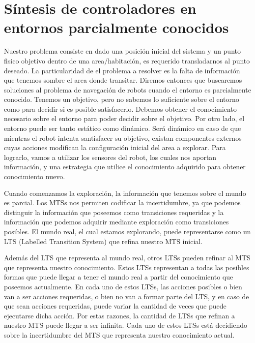 \chapter{Síntesis de controladores en entornos parcialmente conocidos}

Nuestro problema consiste en dado una posición inicial del sistema y un punto 
fisico objetivo dentro de una area/habitación, es requerido transladarnos al 
punto deseado. La particularidad de el problema a resolver es la falta de 
información que tenemos sombre el area donde transitar. Diremos entonces que 
buscaremos soluciones al problema de navegación de robots cuando el entorno es 
parcialmente conocido.
Tenemos un objetivo, pero no sabemos lo suficiente sobre el entorno como para 
decidir si es 
posible satisfacerlo. Debemos obtener el conocimiento necesario sobre el 
entorno para poder decidir sobre el objetivo. 
Por otro lado, el entorno puede ser tanto estático como dinámico. Será dinámico 
en caso de que mientras el robot intenta santisfacer su objetivo, existan 
componentes externos cuyas acciones modifican la configuración inicial del area 
a explorar.
Para lograrlo, vamos a utilizar los sensores del robot, los cuales nos aportan 
información, y una estrategia que 
utilice el conocimiento adquirido para obtener conocimiento nuevo.


Cuando comenzamos la exploración, la información que tenemos sobre el mundo es 
parcial. Los MTSs nos permiten codificar
la incertidumbre, ya que podemos distinguir la información que poseemos como 
transiciones requeridas y la información
que podemos adquirir mediante exploración como transiciones posibles. El mundo 
real, el cual estamos explorando, puede 
representarse como un LTS (Labelled Transition System) que refina nuestro MTS 
inicial.

Además del LTS que representa al mundo real, otros LTSs pueden refinar al MTS 
que representa nuestro conocimiento. Estos
LTSs representan a todas las posibles formas que puede llegar a tener el mundo 
real a partir del conocimiento que poseemos
actualmente. En cada uno de estos LTSs, las acciones posibles o bien van a ser 
acciones requeridas, o bien no van a formar
parte del LTS, y en caso de que sean acciones requeridas, puede variar la 
cantidad de veces que puede ejecutarse dicha acción.
Por estas razones, la cantidad de LTSs que refinan a nuestro MTS puede llegar a 
ser infinita. Cada uno de estos LTSs está
decidiendo sobre la incertidumbre del MTS que representa nuestro conocimiento 
actual.

